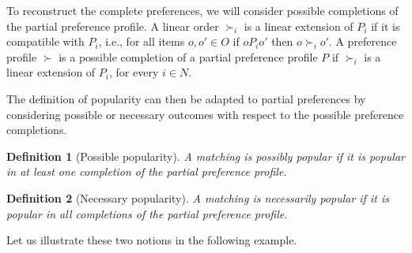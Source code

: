 \documentclass{article}
\newtheorem{definition}{Definition}
\begin{document}
To reconstruct the complete preferences, we will consider possible completions of the partial preference profile.
A linear order $\succ_i$ is a linear extension of $P_i$ if it is compatible with $P_i$, i.e., for all items $o,o'\in O$ if $o P_i o'$ then $o \succ_i o'$. 
A preference profile $\succ$ is a possible completion of a partial preference profile $P$ if $\succ_i$ is a linear extension of $P_i$, for every $i\in N$.

The definition of popularity can then be adapted to partial preferences by considering possible or necessary outcomes with respect to the possible preference completions.

\begin{definition}[Possible popularity]
A matching is possibly popular if it is popular in at least one completion of the partial preference profile.
\end{definition}

\begin{definition}[Necessary popularity]
A matching is necessarily popular if it is popular in all completions of the partial preference profile. 
\end{definition}

Let us illustrate these two notions in the following example.
\end{document}
